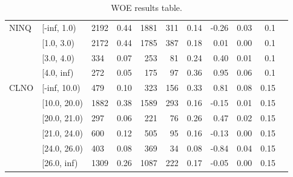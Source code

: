 \begin{landscape}
\begin{table}[!ht]
\begin{tabular}{lllrrrrrrrr}
			\midrule
			     NINQ &  [-inf, 1.0) &   2192 &         0.44 &  1881 &  311 &     0.14 & -0.26 &    0.03 &       0.1 \\
	     &   [1.0, 3.0) &   2172 &         0.44 &  1785 &  387 &     0.18 &  0.01 &    0.00 &       0.1 \\
	     &   [3.0, 4.0) &    334 &         0.07 &   253 &   81 &     0.24 &  0.40 &    0.01 &       0.1 \\
	     &   [4.0, inf) &    272 &         0.05 &   175 &   97 &     0.36 &  0.95 &    0.06 &       0.1 \\
			\midrule
			     CLNO &  [-inf, 10.0) &    479 &         0.10 &   323 &  156 &     0.33 &  0.81 &    0.08 &      0.15 \\
     &  [10.0, 20.0) &   1882 &         0.38 &  1589 &  293 &     0.16 & -0.15 &    0.01 &      0.15 \\
     &  [20.0, 21.0) &    297 &         0.06 &   221 &   76 &     0.26 &  0.47 &    0.02 &      0.15 \\
     &  [21.0, 24.0) &    600 &         0.12 &   505 &   95 &     0.16 & -0.13 &    0.00 &      0.15 \\
     &  [24.0, 26.0) &    403 &         0.08 &   369 &   34 &     0.08 & -0.84 &    0.04 &      0.15 \\
     &   [26.0, inf) &   1309 &         0.26 &  1087 &  222 &     0.17 & -0.05 &    0.00 &      0.15 \\
			\bottomrule
		\end{tabular}
		\caption{WOE results table. \label{woe_2}}
	\end{table}
\end{landscape}